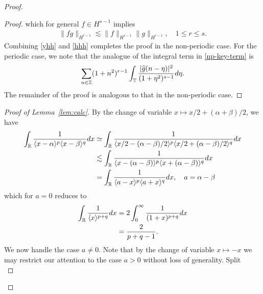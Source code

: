 \begin{proof}
\begin{proof}
which for general $f \in H^{s-1}$ implies 
%
\begin{equation}
  \label{hhh}
\begin{split}
  \| f g \|_{H^{r-1}} \lesssim \|f \|_{H^{s-1}}
  \| g \|_{H^{r-1}}, \quad 1 \le r \le s. 
\end{split}
\end{equation}
%
Combining \eqref{yhh} and \eqref{hhh} completes the proof in the non-periodic
case. For the periodic case, we note that the analogue of the integral term in \eqref{np-key-term} is
%
%
%
\begin{equation*}
\begin{split}
  \sum_{n \in \mathbb{Z}}   (1 + n^{2})^{r-1}\int_{\mathbb{T}} \frac{| \widehat{g}(n - \eta)
  |^{2}}{(1 + \eta^{2})^{s-1}} d \eta. 
\end{split}
\end{equation*}
%
%
The remainder of the proof is analogous to that in the non-periodic case.
\end{proof}
\begin{proof}[Proof of Lemma~\ref{lem:calc}]
%
By the change of variable $x \mapsto x/2 + (\alpha + \beta)/2$, we have
%
%
\begin{equation}
  \label{rry}
	\begin{split}
    \int_{\mathbb{R}} \frac{1}{\langle x - \alpha \rangle^{p} \langle  x -
    \beta
    \rangle^{q}}d x
    & \simeq \int_{\mathbb{R}} \frac{1}{\langle x/2 - (\alpha - \beta)/2  \rangle^{p}
    \langle  x/2 + (\alpha - \beta)/2 \rangle^{q}} d x
    \\
    & \lesssim \int_{\mathbb{R}} \frac{1}{\langle x - (\alpha - \beta)  \rangle^{p}
    \langle  x + (\alpha - \beta) \rangle^{q}} d x
  \\
  & = \int_{\mathbb{R}} \frac{1}{\langle a - x \rangle ^{p} \langle a + x \rangle
  ^{q}} d x, \quad a = \alpha - \beta
\end{split}
\end{equation}
%
which for $a =0$ reduces to 
%
%
\begin{equation*}
\begin{split}
  \int_{\mathbb{R}} \frac{1}{\langle x \rangle ^{p+q}} d x 
  & = 2 \int_{0}^{\infty} \frac{1}{(1 + x)^{p+q}} d x
  \\
  & = \frac{2}{p+q -1}.
\end{split}
\end{equation*}
%
%
We now handle the case $a \neq 0$. Note that by the change of variable $x \mapsto
-x$ we may restrict our attention to the case  $a > 0$ without loss of
generality. Split
%
%
\begin{equation*}

\end{equation*}
\end{proof}
\end{proof}
